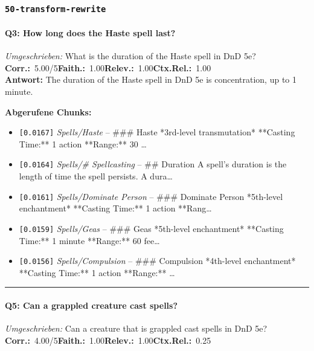 \subsubsection*{\texttt{50-transform-rewrite}}
\label{app:samples:50_transform_rewrite}

\paragraph{Q3: How long does the Haste spell last?}
\textit{Umgeschrieben:} What is the duration of the Haste spell in DnD 5e?\\[2pt]
\noindent \textbf{Corr.:}~5.00/5\quad \textbf{Faith.:}~1.00\quad \textbf{Relev.:}~1.00\quad \textbf{Ctx.Rel.:}~1.00\\

\noindent\textbf{Antwort:} The duration of the Haste spell in DnD 5e is concentration, up to 1 minute.

\noindent\textbf{Abgerufene Chunks:}
\begin{itemize}[noitemsep, topsep=2pt]
  \item[\textbf{\#1}] \texttt{[0.0167]} \textit{Spells/Haste} -- \#\#\# Haste  *3rd-level transmutation*  **Casting Time:** 1 action  **Range:** 30 \ldots
  \item[\textbf{\#2}] \texttt{[0.0164]} \textit{Spells/# Spellcasting} -- \#\# Duration  A spell's duration is the length of time the spell persists. A dura\ldots
  \item[\textbf{\#3}] \texttt{[0.0161]} \textit{Spells/Dominate Person} -- \#\#\# Dominate Person  *5th-level enchantment*  **Casting Time:** 1 action  **Rang\ldots
  \item[\textbf{\#4}] \texttt{[0.0159]} \textit{Spells/Geas} -- \#\#\# Geas  *5th-level enchantment*  **Casting Time:** 1 minute  **Range:** 60 fee\ldots
  \item[\textbf{\#5}] \texttt{[0.0156]} \textit{Spells/Compulsion} -- \#\#\# Compulsion  *4th-level enchantment*  **Casting Time:** 1 action  **Range:** \ldots
\end{itemize}
\vspace{4pt}
\hrule
\vspace{6pt}

\paragraph{Q5: Can a grappled creature cast spells?}
\textit{Umgeschrieben:} Can a creature that is grappled cast spells in DnD 5e?\\[2pt]
\noindent \textbf{Corr.:}~4.00/5\quad \textbf{Faith.:}~1.00\quad \textbf{Relev.:}~1.00\quad \textbf{Ctx.Rel.:}~0.25\\

